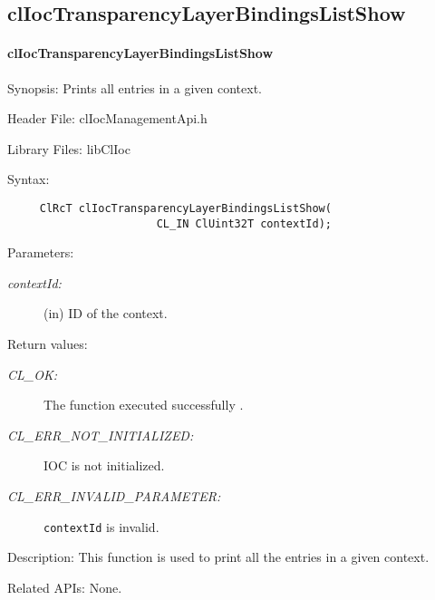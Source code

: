 \begin{flushleft}
\subsection{clIocTransparencyLayerBindingsListShow}
\hypertarget{pageIOC215}{}\paragraph{cl\-Ioc\-Transparency\-Layer\-Bindings\-List\-Show}\label{pageIOC215}
\begin{Desc}
\item[Synopsis:]Prints all entries in a given context.\end{Desc}
\begin{Desc}
\item[Header File:]clIocManagementApi.h\end{Desc}
\begin{Desc}
\item[Library Files:]libClIoc\end{Desc}
\begin{Desc}
\item[Syntax:]

\footnotesize\begin{verbatim}     ClRcT clIocTransparencyLayerBindingsListShow(
                       CL_IN ClUint32T contextId);
\end{verbatim}
\normalsize
\end{Desc}
\begin{Desc}
\item[Parameters:]
\begin{description}
\item[{\em context\-Id:}](in) ID of the context.\end{description}
\end{Desc}
\begin{Desc}
\item[Return values:]
\begin{description}
\item[{\em CL\_\-OK:}]The function executed successfully . \item[{\em CL\_\-ERR\_\-NOT\_\-INITIALIZED:}] IOC is not initialized. 
\item[{\em CL\_\-ERR\_\-INVALID\_\-PARAMETER:}] {\tt{context\-Id}} is invalid.
\end{description}
\end{Desc}
\begin{Desc}
\item[Description:]This function is used to print all the entries in a given context.\end{Desc}
\begin{Desc}
\item[Related APIs:]None.\end{Desc}
\newpage





\end{flushleft}
